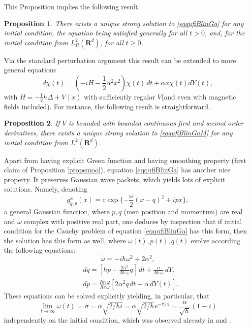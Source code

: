\documentclass[12pt]{article}
\def\R{\mathbf{R}}
\def\al{\alpha}
\newtheorem{prop}{Proposition}[section]
\newcommand{\om}{\omega}
\newcommand{\De}{\Delta}
\begin{document}
This Proposition implies the following result.
\begin{prop}
\label{propsmoo1}
There exists a unique strong solution
to \eqref{eqqufiBlinGa} for any initial condition,
the equation being satisfied generally for all $t>0$,
and, for the initial condition from $L^2_R(\R^d)$, for all $t\ge 0$.
\end{prop}

Via the standard perturbation argument this result can be extended to more general equations
\begin{equation}
\label{eqqufiBlinGaM}
d\chi(t) =(-iH -\frac12 \al^2 x^2) \chi(t) \,dt+\al x \chi(t) dY(t),
\end{equation}
with $H=-\frac12 h\De +V(x)$ with sufficiently regular $V$(and even with magnetic fields included).
 For instance, the following result is straightforward.

\begin{prop}
\label{propsmoo2}
If $V$ is bounded with bounded continuous first and second order derivatives,
there exists a unique strong solution
to \eqref{eqqufiBlinGaM} for any initial condition from $L^2(\R^d)$.
\end{prop}

Apart from having explicit Green function and having smoothing property
(first claim of Proposition \ref{propsmoo}), equation \eqref{eqqufiBlinGa}
has another nice property. It preserves Gaussian wave packets, which yields
lots of explicit solutions. Namely, denoting
\[
g_{q,p}^{\omega}(x)
 =c \exp \{ -\frac{\omega}{2}(x-q)^2+ipx \},
 \]
 a general Gaussian function, where $p,q$ (men position and momentum)
 are real and $\om$ complex with positive real part, one deduces by inspection that
 if initial condition for the Cauchy problem of equation \eqref{eqqufiBlinGa} has this form,
 then the solution has this form as well, where $\om(t), p(t),q(t)$ evolve according the
following equations:
\[
\dot \om =-ih \om ^2+2\al^2,
\]
\[
\begin{aligned}
& dq= [hp  -\frac{2\alpha^2}{Re \, \omega} q]\, dt
+\frac{\alpha}{Re \, \omega} \, dY, \\
& dp= \frac{Im \, \om}{Re \, \omega} [2\al^2 q  \, dt - \al  \, dY(t)].
\end{aligned}
\]
These equations can be solved explicitly yielding, in particular, that
\[
\lim_{t \to \infty} \omega(t) =\sigma=\al \sqrt{2/h i} =\al \sqrt{2/h}e^{-\pi/4}=\frac{\al}{\sqrt h}(1-i)
\]
independently on the initial condition, which was observed already in \cite{Dios88} and \cite{Bel89}.
\end{document}
